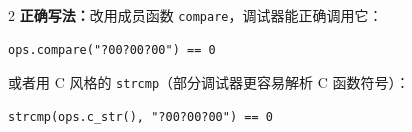 \begin{multicols*}{2}
		\textbf{正确写法：}改用成员函数 \texttt{compare}，调试器能正确调用它：

		\begin{verbatim}
ops.compare("?00?00?00") == 0
		\end{verbatim}

		或者用 C 风格的 \texttt{strcmp}（部分调试器更容易解析 C 函数符号）：

		\begin{verbatim}
strcmp(ops.c_str(), "?00?00?00") == 0
		\end{verbatim}





	\end{multicols*}

